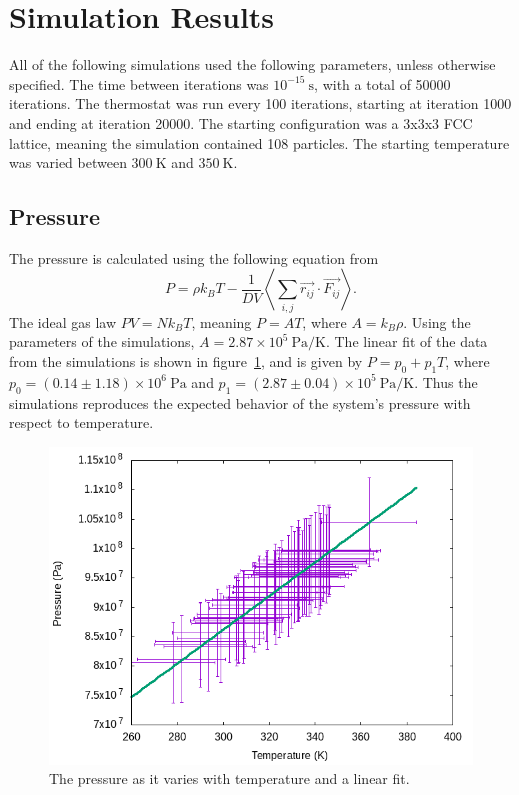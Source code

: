 \documentclass[]{article}
\newcommand{\unit}[2]{#1~\mathrm{#2}}
\begin{document}
\section{Simulation Results}
All of the following simulations used the following parameters, unless otherwise specified.
The time between iterations was $\unit{10^{-15}}{s}$, with a total of 50000 iterations.
The thermostat was run every 100 iterations, starting at iteration 1000 and ending at iteration 20000.
The starting configuration was a 3x3x3 FCC lattice, meaning the simulation contained 108 particles.
The starting temperature was varied between $\unit{300}{K}$ and $\unit{350}{K}$.

\subsection{Pressure}
The pressure is calculated using the following equation from \cite{cheung1977}
\[
P = \rho k_{B} T - \frac{1}{DV} \left< \sum_{i,j} \vec{r_{ij}} \cdot \vec{F_{ij}} \right> .
\]
The ideal gas law $P V = N k_{B} T$, meaning $P = A T$, where $A = k_{B} \rho$.
Using the parameters of the simulations, $A = \unit{2.87 \times 10^{5}}{Pa/K}$.
The linear fit of the data from the simulations is shown in figure~\ref{fig:P_T}, and is given by $P = p_{0} + p_{1} T$, where $p_{0} = \unit{(0.14 \pm 1.18) \times 10^{6}}{Pa}$ and $p_{1} = \unit{(2.87 \pm 0.04)\times 10^{5}}{Pa/K}$.
Thus the simulations reproduces the expected behavior of the system's pressure with respect to temperature.

\begin{figure}[htb]
	\centering
	\includegraphics[width=\textwidth]{figures/P_T.png}
	\caption{The pressure as it varies with temperature and a linear fit.}
	\label{fig:P_T}
\end{figure}
\end{document}
